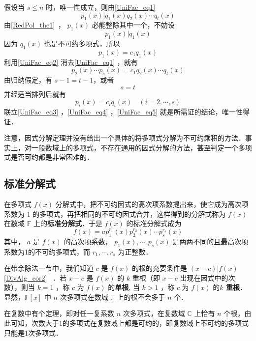 假设当 $s\leq n$ 时，唯一性成立，则由\autoref{UniFac_eq1} 
 \begin{equation}
 p_1(x)|q_1(x)q_2(x)\cdots q_t(x)
 \end{equation}
 由\autoref{RedPol_the1}~， $p_1(x)$ 必能整除其中一个，不妨设
 \begin{equation}
 p_1(x)|q_1(x)
 \end{equation}
 因为 $q_1(x)$ 也是不可约多项式，所以
 \begin{equation}\label{UniFac_eq2}
 p_1(x)=c_1q_1(x)
 \end{equation}
 利用\autoref{UniFac_eq2} 消去\autoref{UniFac_eq1} ，就有
 \begin{equation}\label{UniFac_eq3}
 p_2(x)\cdots p_s(x)=c_1q_2(x)\cdots q_t(x)
 \end{equation}
 由归纳假定，有 $s-1=t-1$，或者
 \begin{equation}\label{UniFac_eq4}
 s=t
 \end{equation}
 并经适当排列后就有
 \begin{equation}\label{UniFac_eq5}
 p_i(x)=c_iq_i(x)\quad (i=2,\cdots,s)
 \end{equation}
 联立\autoref{UniFac_eq3} ，\autoref{UniFac_eq4} ，\autoref{UniFac_eq5} 就是所需证的结论，唯一性得证．

注意，因式分解定理并没有给出一个具体的将多项式分解为不可约乘积的方法．事实上，对一般数域上的多项式，不存在通用的因式分解的方法，甚至判定一个多项式是否可约都是非常困难的．
\subsection{标准分解式}
在多项式 $f(x)$ 分解式中，把不可约因式的高次项系数提出来，使它成为高次项系数为 1 的多项式，再把相同的不可约因式合并，这样得到的分解式称为 $f(x)$ 在数域 $\mathbb{F}$ 上的\textbf{标准分解式}．于是 $f(x)$ 的标准分解式成为
\begin{equation}
f(x)=ap_1^{r_1}(x)p_2^{r_2}(x)\cdots p_s^{r_s}(x)
\end{equation}
其中， $a$ 是 $f(x)$ 的高次项系数， $p_1(x),\cdots,p_s(x)$ 是两两不同的且最高次项系数为1的不可约多项式，而 $r_1,\cdots ,r_s$ 为正整数．

在带余除法一节中，我们知道 $c$ 是 $f(x)$ 的根的充要条件是 $(x-c)|f(x)$ \autoref{DivAlg_cor2}~ ．若 $x-c$ 是 $f(x)$ 的 $k$ 重根（即 $x-c$ 出现在因式中的次数），则当 $k=1$ ，称 $c$ 为 $f(x)$ 的\textbf{单根}, 当 $k>1$ ，称 $c$ 为 $f(x)$ 的\textbf{$k$ 重根}．显然，$\mathbb{F}[x]$ 中 $n$ 次多项式在数域 $\mathbb{F}$ 上的根不会多于 $n$ 个．

在复数中有个定理，即对任一复系数 $n$ 次多项式，在复数域 $\mathbb{C}$ 上恰有 $n$ 个根，由此可知，次数大于1的多项式在复数域上都是可约的，即复数域上不可约的多项式只能是1次多项式．